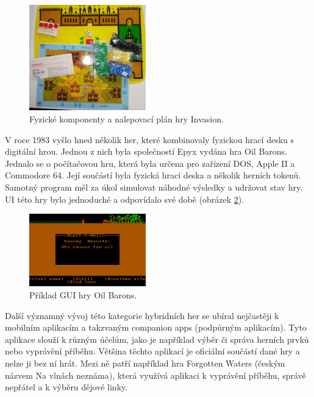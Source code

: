 \begin{figure}[H]
    \centering
    \includegraphics[width=0.45\textwidth]{resources/figures/invasion.jpg}
    \caption{Fyzické komponenty a nalepovací plán hry Invasion.\cite{invasion}}
    \label{fig:invasion}
\end{figure}

V roce 1983 vyšlo hned několik her, které kombinovaly fyzickou hrací desku s digitální hrou. Jednou z nich byla společností Epyx vydána hra Oil Barons. Jednalo se o počítačovou hru, která byla určena pro zařízení DOS, Apple II a Commodore 64. Její součástí byla fyzická hrací deska a několik herních tokenů. Samotný program měl za úkol simulovat náhodné výsledky a udržovat stav hry. UI této hry bylo jednoduché a odpovídalo své době (obrázek \ref{fig:oil_barons}).\cite{oil_barons}

\begin{figure}[H]
    \centering
    \includegraphics[width=0.45\textwidth]{resources/figures/oil_barons.png}
    \caption{Příklad GUI hry Oil Barons.\cite{oil_barons}}
    \label{fig:oil_barons}
\end{figure}

Další významný vývoj této kategorie hybridních her se ubíral nejčastěji k mobilním aplikacím a takzvaným companion apps (podpůrným aplikacím). Tyto aplikace slouží k různým účelům, jako je například výběr či správa herních prvků nebo vyprávění příběhu. Většina těchto aplikací je oficiální součástí dané hry a nelze ji bez ní hrát. Mezi ně patří například hra Forgotten Waters (českým názvem Na vlnách neznáma), která využívá aplikaci k vyprávění příběhu, správě nepřátel a k výběru dějové linky.

